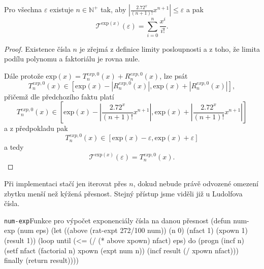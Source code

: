 \begin{consequence}
Pro všechna $\varepsilon$ existuje $n\in\mathbb{N}^+$ tak, aby $\left|\frac{2.72^x}{(n+1)!}x^{n+1}\right| \leq \varepsilon$ a pak
\begin{equation}
\mathcal{T}^{\mathrm{exp}(x)}(\varepsilon)=\sum_{i=0}^n \frac{x^i}{i!}.
\end{equation}
\begin{proof}
Existence čísla $n$ je zřejmá z definice limity posloupnosti a z toho, že limita podílu polynomu a faktoriálu je rovna nule.

Dále protože $\mathrm{exp}(x) = T^{exp, 0}_n(x)+R^{exp, 0}_n(x)$, lze psát
\begin{equation}
T^{exp, 0}_n(x) \in [\mathrm{exp}(x) - |R^{exp, 0}_n(x)|, \mathrm{exp}(x) + |R^{exp, 0}_n(x)|],
\end{equation}
přičemž dle předchozího faktu platí
\begin{equation}
T^{exp, 0}_n(x) \in [\mathrm{exp}(x) - \left| \frac{2.72^x}{(n+1)!}x^{n+1} \right|, \mathrm{exp}(x) + \left| \frac{2.72^x}{(n+1)!}x^{n+1} \right|]
\end{equation}
a z předpokladu pak
\begin{equation}
T^{exp, 0}_n(x) \in [\mathrm{exp}(x) - \varepsilon, \mathrm{exp}(x) + \varepsilon]
\end{equation}
a tedy
\begin{equation}\label{eq:tat}
\mathcal{T}^{\mathrm{exp}(x)}(\varepsilon) = T^{exp, 0}_n(x).
\end{equation}
\end{proof}
\end{consequence}

Při implementaci stačí jen iterovat přes $n$, dokud nebude právě odvozené omezení zbytku menší než kýžená přesnost. Stejný přístup jsme viděli již u Ludolfova čísla.

\begin{lispcode}{\texttt{num-exp}}{Funkce pro výpočet exponenciály čísla na danou přesnost}
(\textcolor{funkcionalni}{defun} \textcolor{pojmenovan}{num-exp} (num eps)
  (\textcolor{vedlejsi}{let} ((above (rat-expt 272/100 num)) (n 0)
      (nfact 1) (xpown 1) (result 1))
    (\textcolor{funkcionalni}{loop} 
      \textcolor{obarvi}{until} (\textcolor{matematicke}{<=} (\textcolor{matematicke}{/} (\textcolor{matematicke}{*} above xpown) nfact) eps)
      \textcolor{obarvi}{do} (progn
        (\textcolor{vedlejsi}{incf} n)
        (\textcolor{vedlejsi}{setf} nfact (\textcolor{moje}{factorial} n)
          xpown (\textcolor{matematicke}{expt} num n))
        (\textcolor{vedlejsi}{incf} result (\textcolor{matematicke}{/} xpown nfact)))
      \textcolor{obarvi}{finally} (\textcolor{funkcionalni}{return} result))))
\end{lispcode}

